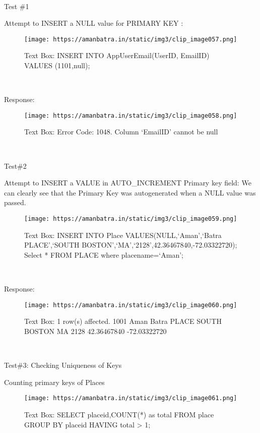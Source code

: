 \documentclass[
]{article}
\begin{document}
~

Test \#1

Attempt to INSERT a NULL value for PRIMARY KEY :

\begin{figure}
\centering
\texttt{[image: https://amanbatra.in/static/img3/clip\_image057.png]}
\caption{Text Box: INSERT INTO AppUserEmail(UserID, EmailID) VALUES
(1101,null);}
\end{figure}

~

Response:

\begin{figure}
\centering
\texttt{[image: https://amanbatra.in/static/img3/clip\_image058.png]}
\caption{Text Box: Error Code: 1048. Column `EmailID' cannot be null}
\end{figure}

~

Test\#2

Attempt to INSERT a VALUE in AUTO\_INCREMENT Primary key field: We can
clearly see that the Primary Key was autogenerated when a NULL value was
passed.

\begin{figure}
\centering
\texttt{[image: https://amanbatra.in/static/img3/clip\_image059.png]}
\caption{Text Box: INSERT INTO Place VALUES(NULL,`Aman',`Batra
PLACE',`SOUTH BOSTON',`MA',`2128',42.36467840,-72.03322720); Select *
FROM PLACE where placename=`Aman';}
\end{figure}

~

Response:

\begin{figure}
\centering
\texttt{[image: https://amanbatra.in/static/img3/clip\_image060.png]}
\caption{Text Box: 1 row(s) affected. 1001 Aman Batra PLACE SOUTH BOSTON
MA 2128 42.36467840 -72.03322720}
\end{figure}

~

Test\#3: Checking Uniqueness of Keys

Counting primary keys of Places

\begin{figure}
\centering
\texttt{[image: https://amanbatra.in/static/img3/clip\_image061.png]}
\caption{Text Box: SELECT placeid,COUNT(*) as total FROM place GROUP BY
placeid HAVING total \textgreater{} 1;}
\end{figure}
\end{document}
